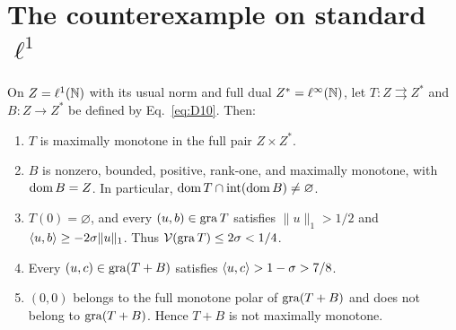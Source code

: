 \section{The counterexample on standard $\ell^1$}
\label{sec:l1}
\renewcommand{\thetheorem}{L}
\begin{theorem}\label{thm:L}
On $Z=\ell^1(\mathbb N)$ with its usual norm and full dual $Z^*=\ell^\infty(\mathbb N)$,
let $T:Z\rightrightarrows Z^*$ and $B:Z\to Z^*$ be defined by Eq.~\eqref{eq:D10}.
Then:
\begin{enumerate}
\item $T$ is maximally monotone in the full pair $Z\times Z^*$.
\item $B$ is nonzero, bounded, positive, rank-one, and maximally monotone,
with $\operatorname{dom} B=Z$. In particular,
$\operatorname{dom} T\cap\operatorname{int}(\operatorname{dom} B)\ne\varnothing$.
\item $T(0)=\varnothing$, and every $(u,b)\in\operatorname{gra} T$ satisfies
$\|u\|_1>1/2$ and $\langle u,b\rangle\ge-2\sigma\|u\|_1$.
Thus $\mathcal V(\operatorname{gra} T)\le2\sigma<1/4$.
\item Every $(u,c)\in\operatorname{gra}(T+B)$ satisfies
$\langle u,c\rangle>1-\sigma>7/8$.
\item $(0,0)$ belongs to the full monotone polar of $\operatorname{gra}(T+B)$ and does
not belong to $\operatorname{gra}(T+B)$. Hence $T+B$ is not maximally monotone.
\end{enumerate}
\end{theorem}
